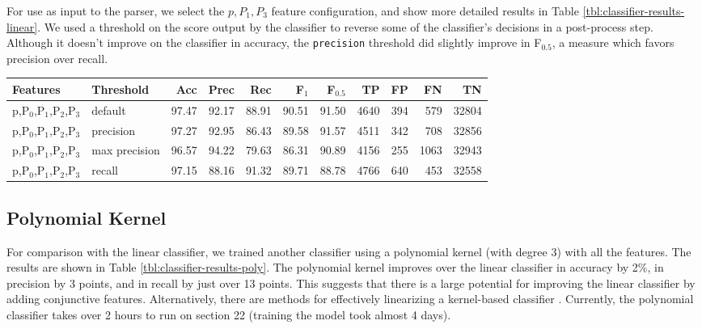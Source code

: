\documentclass[11pt]{article}
\begin{document}
\label{sec:linear-classifier}
For use as input to the parser, we select the $p,P_{1},P_{3}$
feature configuration, and show more detailed results in
Table \ref{tbl:classifier-results-linear}. We used a threshold on the
score output by the classifier to reverse some of the classifier's
decisions in a post-process step. Although it doesn't improve on the
classifier in accuracy, the \texttt{precision} threshold did slightly improve in
F$_{\text{0.5}}$, a measure which favors precision over recall.

\begin{table*}[htbp]

\begin{tabular}{llrrrrrrrrr}
Features & Threshold & Acc & Prec & Rec & F$_{\text{1}}$ & F$_{\text{0.5}}$ & TP & FP & FN & TN\\
\hline
p,P$_{\text{0}}$,P$_{\text{1}}$,P$_{\text{2}}$,P$_{\text{3}}$ & default & 97.47 & 92.17 & 88.91 & 90.51 & 91.50 & 4640 & 394 & 579 & 32804\\
p,P$_{\text{0}}$,P$_{\text{1}}$,P$_{\text{2}}$,P$_{\text{3}}$ & precision & 97.27 & 92.95 & 86.43 & 89.58 & 91.57 & 4511 & 342 & 708 & 32856\\
p,P$_{\text{0}}$,P$_{\text{1}}$,P$_{\text{2}}$,P$_{\text{3}}$ & max precision & 96.57 & 94.22 & 79.63 & 86.31 & 90.89 & 4156 & 255 & 1063 & 32943\\
p,P$_{\text{0}}$,P$_{\text{1}}$,P$_{\text{2}}$,P$_{\text{3}}$ & recall & 97.15 & 88.16 & 91.32 & 89.71 & 88.78 & 4766 & 640 & 453 & 32558\\
\end{tabular}

\caption{Results of polynomial classifier using different score thresholds.}
\label{tbl:classifier-results-poly}
\end{table*}

\subsection{Polynomial Kernel}
\label{sec-4-5}

\label{sec:poly-classifier} For comparison with the linear classifier,
we trained another classifier using a polynomial kernel (with
degree 3) with all the features. The results are shown in Table
\ref{tbl:classifier-results-poly}. The polynomial kernel improves over
the linear classifier in accuracy by 2\%, in precision by 3 points, and
in recall by just over 13 points. This suggests that there is a large
potential for improving the linear classifier by adding conjunctive
features. Alternatively, there are methods for effectively linearizing
a kernel-based classifier \cite{Kudo2003,Isozaki2002}.
Currently, the polynomial classifier takes over 2 hours to run on
section 22 (training the model took almost 4 days).
\end{document}
